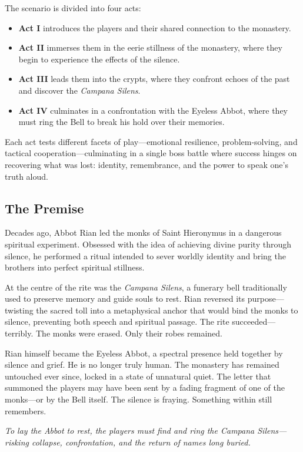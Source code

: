 \documentclass[nodeprecatedcode,bg=print]{dndbook/dndbook}
\begin{document}
The scenario is divided into four acts: 
\begin{itemize}
    \item \textbf{Act I} introduces the players and their shared connection to the monastery.
    \item \textbf{Act II} immerses them in the eerie stillness of the monastery, where they begin to experience the effects of the silence.
    \item \textbf{Act III} leads them into the crypts, where they confront echoes of the past and discover the \emph{Campana Silens}.
    \item \textbf{Act IV} culminates in a confrontation with the Eyeless Abbot, where they must ring the Bell to break his hold over their memories.
\end{itemize}
Each act tests different facets of play—emotional resilience, problem-solving, and tactical cooperation—culminating in a single boss battle where success hinges on recovering what was lost: identity, remembrance, and the power to speak one’s truth aloud.

\subsection*{The Premise}
Decades ago, Abbot Rian led the monks of Saint Hieronymus in a dangerous spiritual experiment. Obsessed with the idea of achieving divine purity through silence, he performed a ritual intended to sever worldly identity and bring the brothers into perfect spiritual stillness.

At the centre of the rite was the \emph{Campana Silens}, a funerary bell traditionally used to preserve memory and guide souls to rest. Rian reversed its purpose—twisting the sacred toll into a metaphysical anchor that would bind the monks to silence, preventing both speech and spiritual passage. The rite succeeded—terribly. The monks were erased. Only their robes remained.

Rian himself became the Eyeless Abbot, a spectral presence held together by silence and grief. He is no longer truly human. The monastery has remained untouched ever since, locked in a state of unnatural quiet. The letter that summoned the players may have been sent by a fading fragment of one of the monks—or by the Bell itself. The silence is fraying. Something within still remembers.

\emph{To lay the Abbot to rest, the players must find and ring the Campana Silens—risking collapse, confrontation, and the return of names long buried.}
\end{document}
